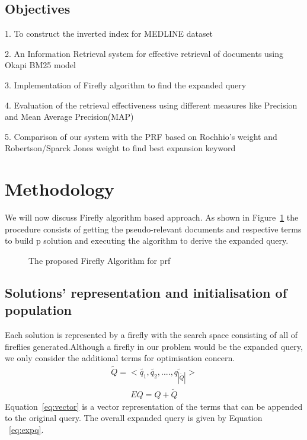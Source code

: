 \documentclass{nitk}
\begin{document}
\subsection{Objectives}
1. To construct the inverted index for MEDLINE dataset

2. An Information Retrieval system for effective retrieval of documents using Okapi BM25 model

3. Implementation of Firefly algorithm to find the expanded query

4. Evaluation of the retrieval effectiveness using different measures like Precision and Mean Average Precision(MAP)

5. Comparison of our system with the PRF based on Rochhio's weight and Robertson/Sparck Jones weight to find best expansion keyword 
\newpage
\section{Methodology}
We will now discuss Firefly algorithm based approach. As shown in Figure~\ref{fig:flowchart} the procedure consists of getting the pseudo-relevant documents and respective terms to build p solution and executing the algorithm to derive the expanded query.
\begin{figure}[!htb]

\caption{The proposed Firefly Algorithm for prf}
\label{fig:flowchart}
\end{figure}
\subsection{Solutions' representation and initialisation of population}
Each solution is represented by a firefly with the search space consisting of all of fireflies generated.Although a firefly in our problem would be the expanded query, we only consider the additional terms for optimisation concern.
\begin{equation}
\label{eq:vector}
\begin{aligned}
\tilde{Q} = < \tilde{q_1},\tilde{q_2},....,\tilde{q_{|\tilde{Q}|}} >
\end{aligned}
\end{equation}
\begin{equation}
\label{eq:expq}
\begin{aligned}
	EQ = Q + \tilde{Q}
\end{aligned}
\end{equation}
Equation~\ref{eq:vector} is a vector representation of the terms that can be appended to the original query. The overall expanded query is given by Equation ~\ref{eq:expq}.
\end{document}
